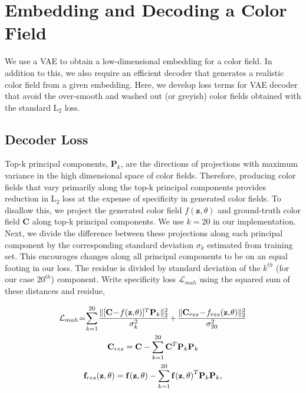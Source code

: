 \documentclass[10pt,twocolumn,letterpaper]{article}
\begin{document}
\section{Embedding and Decoding a Color Field}\label{sec:vae}

We use a VAE to obtain a low-dimensional embedding for a color field. In addition 
to this, we also require an efficient decoder that generates a realistic color field from a given
embedding. Here, we develop loss terms for VAE decoder that avoid the over-smooth and washed
out (or greyish) color fields obtained with the standard L$_2$ loss. 

\subsection{Decoder Loss}\label{sec:vae_dec_loss} Top-k principal components, $\mathbf{P}_k$, are the directions of 
projections with maximum variance in the high dimensional space of color fields. 
Therefore, producing color fields that vary primarily along the top-k principal components 
provides reduction in L$_2$ loss at the expense of specificity in generated color fields. To 
disallow this, we project the generated color field $f(\mathbf{z}, \theta)$ and ground-truth 
color field $\mathbf{C}$ along top-k principal components. We use $k=20$ in our implementation. Next, we divide the 
difference between these projections along each principal component by the corresponding 
standard deviation $\sigma_{k}$ estimated from training set. This encourages changes along 
all principal components to be on an equal footing in our loss. The 
residue is divided by standard deviation of the $k^{th}$ (for our case $20^{th}$) component. 
Write specificity loss $\mathcal{L}_{mah}$ using the squared sum of these distances and residue,

\begin{gather*}
\medmuskip=1mu
\thinmuskip=1mu
\thickmuskip=1mu
\label{eq:vae_loss_pca}
\mathcal{L}_{mah} = \sum\limits_{k=1}^{20} \frac{\| \lbrack \mathbf{C} - f({\mathbf{z}, \theta})\rbrack^{T} 
\mathbf{P}_{k} \|^{2}_{2}}{\sigma^{2}_{k}} \; + \; 
\frac{\| \mathbf{C}_{res} - f_{res}(\mathbf{z}, \theta)\|^{2}_{2}}{\sigma^{2}_{20}} \\
\mathbf{C}_{res} = \mathbf{C} - \sum\limits_{k=1}^{20} \mathbf{C}^{T}\mathbf{P}_k \mathbf{P}_k \\ 
\mathbf{f}_{res}(\mathbf{z}, \theta) = \mathbf{f(\mathbf{z}, \theta)} - \sum\limits_{k=1}^{20} \mathbf{f(\mathbf{z}, \theta)}^{T}\mathbf{P}_k \mathbf{P}_k,  
\end{gather*}
\end{document}
